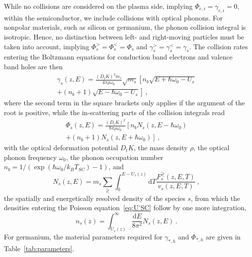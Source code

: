 \documentclass[pre,reprint,floats]{revtex4-1}
\newcommand{\rmd}{\ensuremath{\mathrm{d}}}
\begin{document}
While no collisions are considered on the plasma side, implying $\Phi_{e,i} = \gamma_{e,i} = 0$, 
within the semiconductor, we include collisions with optical phonons. For nonpolar materials, such as
silicon or germanium, the phonon collision integral is isotropic. Hence, no distinction between 
left- and right-moving particles must be taken into account, implying $\Phi_s^>=\Phi_s^<=\Phi_s$ 
and $\gamma_s^>=\gamma_s^<=\gamma_s$. The collision rates entering the 
Boltzmann equations for conduction band electrons and valence band holes are then~\cite{Ridley99,Roth92}
\begin{multline}\label{eq:gamma}
\gamma_s(z,E) = \frac{(D_tK)^2m_s}{4 \pi\rho \omega_0}\sqrt{m_s} \left [ n_b \sqrt{E+\hbar\omega_0 -U_s}\right. \\
\left.+ (n_b+1)\sqrt{E-\hbar\omega_0 -U_s}\right]~,
\end{multline}
where the second term in the square brackets only applies if the argument of the root is positive, while 
the in-scattering parts of the collision integrals read 
\begin{multline}
\Phi_s(z,E) = \frac{(D_tK)^2}{8 \pi\rho \omega_0} \left[ n_b N_s(z,E-\hbar\omega_0)\right. \\
\left.	+ (n_b+1)N_s(z,E+\hbar\omega_0)\right]~,
\end{multline}	
with the optical deformation potential $D_t K$, the mass density $\rho$, the optical phonon frequency 
$\omega_0$, the phonon occupation number $n_b = 1/\left(\exp(\hbar\omega_0/k_BT_{SC})-1\right)$, and
\begin{equation}
\label{eq:Is}
N_s(z,E) = m_s\sum_{\gtrless}\int_{0}^{E-U_s(z)}\rmd T\frac{F_s^\gtrless(z,E,T)}{v_s(z,E,T)}~,
\end{equation}
the spatially and energetically resolved density of the species $s$, from which the densities entering
the Poisson equation~\eqref{eq:U'SC} follow by one more integration,
\begin{equation}
\label{eq:n}
n_s(z) = \int_{U_s(z)}^\infty \frac{\mathrm{d}E}{8\pi^2}N_s(z,E)~.
\end{equation}
For germanium, the material parameters required for $\gamma_{*,h}$ and $\Phi_{*,h}$ are given in 
Table~\ref{tab:parameters}. 
	
\end{document}
